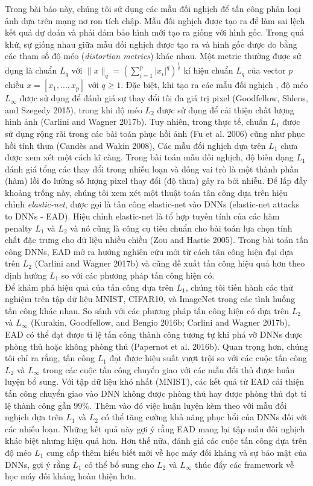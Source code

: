 Trong bài báo này, chúng tôi sử dụng các mẫu đối nghịch để tấn công phân loại ảnh dựa trên 
mạng nơ ron tích chập. Mẫu đối nghịch được tạo ra để làm sai lệch kết quả dự đoán và phải đảm bảo
hình mới tạo ra giống với hình gốc. Trong quá khứ, sự giống nhau giữa mẫu đối nghịch được tạo
ra và hình gốc được đo bằng các tham số độ méo (\textit{distortion metrics}) khác nhau.
Một metric thường được sử dụng là chuẩn $L_q$ 
với $\lVert x \rVert_q = \left( \sum_{i=1}^p |x_i|^q \right)^{\frac{1}{q}}$ kí hiệu chuẩn $L_q$
của vector $p$ chiều $x = [x_1, ..., x_p]$ với $q \geq 1$. Đặc biệt, khi tạo ra các mẫu đối nghịch
, độ méo $L_{\infty}$ được sử dụng để đánh giá sự thay đổi tối đa giá trị pixel (Goodfellow, 
Shlens, and Szegedy 2015), trong khi độ méo $L_2$ được sử đụng để cải thiện chất lượng hình 
ảnh (Carlini and Wagner 2017b). Tuy nhiên, trong thực tế, chuẩn $L_1$ được sử dụng rộng rãi 
trong các bài toán phục hồi ảnh (Fu et al. 2006) cũng như phục hồi tính thưa (Candès and Wakin 2008),
Các mẫu đối nghịch dựa trên $L_1$ chưa được xem xét một cách kĩ càng. Trong bài toán mẫu đối nghịch,
độ biến dạng $L_1$ đánh giá tổng các thay đổi trong nhiễu loạn và đống vai trò là một thành phần
(hàm) lồi đo lường số lượng pixel thay đổi (độ thưa) gây ra bởi nhiễu. Để lấp đầy khoảng trống
này, chúng tôi xem xét một thuật toán tân công dựa trên hiệu chỉnh \textit{elastic-net}, được 
gọi là tấn công elastic-net vào DNNs (elastic-net attacks to DNNs - EAD). Hiệu chỉnh 
elastic-net là tổ hợp tuyến tính của các hàm penalty $L_1$ và $L_2$ và nó cũng là công cụ 
tiêu chuẩn cho bài toán lựa chọn tính chất đặc trưng cho dữ liệu nhiều chiều (Zou and Hastie 2005). 
Trong bài toán tấn công DNNs, EAD mở ra hướng nghiên cứu mới từ cách tân công hiện đại dựa trên 
$L_2$ (Carlini and Wagner 2017b) và cũng đề xuất tấn công hiệu quả hơn theo định hướng $L_1$
so với các phương pháp tấn công hiện có. \\

Để khám phá hiệu quả của tấn công dựa trên $L_1$, chúng tôi tiến hành các thử nghiệm trên tập 
dữ liệu MNIST, CIFAR10, và ImageNet trong các tình huống tấn công khác nhau. So sánh với các 
phương pháp tấn công hiện có dựa trên $L_2$ và $L_{\infty}$ (Kurakin, Goodfellow, and 
Bengio 2016b; Carlini and Wagner 2017b), EAD có thể đạt được tỉ lệ tấn công thành công tương 
tự khi phá vỡ DNNs được phòng thủ hoặc không phòng thủ (Papernot et al. 2016b). Quan trọng 
hơn, chúng tôi chỉ ra rằng, tấn công $L_1$ đạt được hiệu suất vượt trội so với các cuộc tấn
công $L_2$ và $L_{\infty}$ trong các cuộc tấn công chuyển giao với các mẫu đổi thủ được huấn
luyện bổ sung. Với tập dữ liệu khó nhất (MNIST), các kết quả từ EAD cải thiện tấn công chuyển 
giao vào DNN không được phòng thủ hay được phòng thủ đạt tỉ lệ thành công gần $99\%$. Thêm vào 
đó việc huận luyện kèm theo với mẫu đối nghịch dựa trên $L_1$ và $L_2$ có thể tăng cường khả 
năng phục hổi của DNNs đối với các nhiễu loạn. Những kết quả này gợi ý rằng EAD mang lại tập 
mẫu đối nghịch khác biệt nhưng hiệu quả hơn. Hơn thế nữa, đánh giá các cuộc tấn công dựa trên 
độ méo $L_1$ cung cấp thêm hiểu biết mới về học máy đối kháng và sự bảo mật của DNNs, gợi 
ý rằng $L_1$ có thể bổ sung cho $L_2$ và $L_{\infty}$ thúc đẩy các framework về học máy đối 
kháng hoàn thiện hơn.
